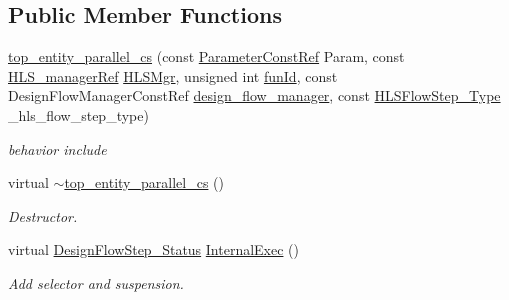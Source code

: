 \subsection*{Public Member Functions}
\begin{DoxyCompactItemize}
\item 
\hyperlink{classtop__entity__parallel__cs_af70a7968013d5ef557934176aab944cb}{top\+\_\+entity\+\_\+parallel\+\_\+cs} (const \hyperlink{Parameter_8hpp_a37841774a6fcb479b597fdf8955eb4ea}{Parameter\+Const\+Ref} Param, const \hyperlink{hls__manager_8hpp_acd3842b8589fe52c08fc0b2fcc813bfe}{H\+L\+S\+\_\+manager\+Ref} \hyperlink{classHLS__step_ade85003a99d34134418451ddc46a18e9}{H\+L\+S\+Mgr}, unsigned int \hyperlink{classHLSFunctionStep_a3e6434fd86c698b0c70520b859bff5b0}{fun\+Id}, const Design\+Flow\+Manager\+Const\+Ref \hyperlink{classDesignFlowStep_ab770677ddf087613add30024e16a5554}{design\+\_\+flow\+\_\+manager}, const \hyperlink{hls__step_8hpp_ada16bc22905016180e26fc7e39537f8d}{H\+L\+S\+Flow\+Step\+\_\+\+Type} \+\_\+hls\+\_\+flow\+\_\+step\+\_\+type)
\begin{DoxyCompactList}\small\item\em behavior include \end{DoxyCompactList}\item 
virtual \hyperlink{classtop__entity__parallel__cs_afc7dcd3b8506320d49f863f4da99aaae}{$\sim$top\+\_\+entity\+\_\+parallel\+\_\+cs} ()
\begin{DoxyCompactList}\small\item\em Destructor. \end{DoxyCompactList}\item 
virtual \hyperlink{design__flow__step_8hpp_afb1f0d73069c26076b8d31dbc8ebecdf}{Design\+Flow\+Step\+\_\+\+Status} \hyperlink{classtop__entity__parallel__cs_a1df713ee7535a6ef73f1df004ca4aa43}{Internal\+Exec} ()
\begin{DoxyCompactList}\small\item\em Add selector and suspension. \end{DoxyCompactList}\end{DoxyCompactItemize}
